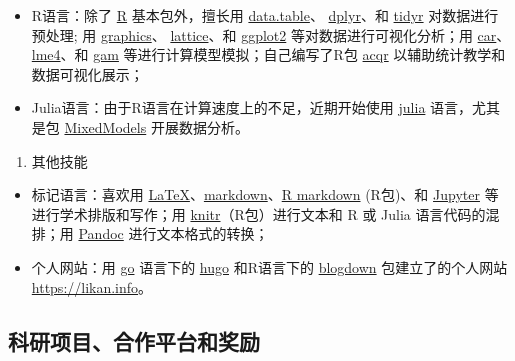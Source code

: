 \documentclass[12pt,]{article}
\providecommand{\tightlist}{%
  \setlength{\itemsep}{0pt}\setlength{\parskip}{0pt}}
\begin{document}
\begin{itemize}
\tightlist
\item
  R语言：除了 \href{https://www.r-project.org}{R} 基本包外，擅长用
  \href{http://r-datatable.com}{data.table}、
  \href{https://cran.r-project.org/web/packages/dplyr/index.html}{dplyr}、和
  \href{https://cran.r-project.org/web/packages/tidyr/index.html}{tidyr}
  对数据进行预处理; 用
  \href{https://stat.ethz.ch/R-manual/R-devel/library/graphics/html/00Index.html}{graphics}、
  \href{https://cran.r-project.org/package=lattice}{lattice}、和
  \href{http://ggplot2.tidyverse.org}{ggplot2}
  等对数据进行可视化分析；用
  \href{https://cran.r-project.org/web/packages/car/index.html}{car}、\href{https://github.com/lme4/lme4}{lme4}、和
  \href{https://cran.r-project.org/web/packages/gam/index.html}{gam}
  等进行计算模型模拟；自己编写了R包
  \href{https://github.com/likanzhan/acqr}{acqr}
  以辅助统计教学和数据可视化展示；
\item
  Julia语言：由于R语言在计算速度上的不足，近期开始使用
  \href{https://julialang.org}{julia} 语言，尤其是包
  \href{https://github.com/dmbates/MixedModels.jl}{MixedModels}
  开展数据分析。
\end{itemize}

\begin{enumerate}
\def\labelenumi{\arabic{enumi}.}
\setcounter{enumi}{2}
\tightlist
\item
  其他技能
\end{enumerate}

\begin{itemize}
\tightlist
\item
  标记语言：喜欢用
  \href{https://www.latex-project.org}{LaTeX}、\href{https://daringfireball.net/projects/markdown/}{markdown}、\href{https://rmarkdown.rstudio.com}{R
  markdown} (R包)、和 \href{https://jupyter.org}{Jupyter}
  等进行学术排版和写作；用
  \href{https://cran.r-project.org/web/packages/knitr/index.html}{knitr}（R包）进行文本和
  R 或 Julia 语言代码的混排；用 \href{https://pandoc.org}{Pandoc}
  进行文本格式的转换；
\item
  个人网站：用 \href{https://golang.org}{go} 语言下的
  \href{https://gohugo.io}{hugo} 和R语言下的
  \href{https://github.com/rstudio/blogdown}{blogdown}
  包建立了的个人网站 \url{https://likan.info}。
\end{itemize}

\hypertarget{section-5}{%
\subsection{科研项目、合作平台和奖励}\label{section-5}}
\end{document}
